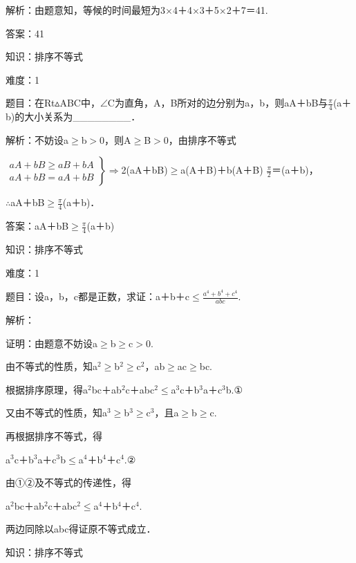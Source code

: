 \documentclass{article} %
\begin{document}
 解析：由题意知，等候的时间最短为3$\mathrm{\times}$4＋4$\mathrm{\times}$3＋5$\mathrm{\times}$2＋7＝41.

 答案：41

 

 知识：排序不等式

 难度：1

 题目：在Rt$\mathrm{\vartriangle}$ABC中，$\mathrm{\angle}$C为直角，A，B所对的边分别为a，b，则aA＋bB与$\frac{\pi}{4}$(a＋b)的大小关系为\_\_\_\_\_\_\_\_．

 解析：不妨设a$\mathrm{\ge}$b$\mathrm{>}$0，则A$\mathrm{\ge}$B$\mathrm{>}$0，由排序不等式

$\left.\begin{array}{l} aA+bB\ge aB+bA\\ aA+bB=aA+bB \end{array}\right\}\mathrm{\Rightarrow }$2(aA＋bB)$\mathrm{\ge}$a(A＋B)＋b(A＋B) $\frac{\pi}{2}$＝(a＋b)，

$\mathrm{\therefore}$aA＋bB$\mathrm{\ge}\frac{\pi}{4}$(a＋b)．

 答案：aA＋bB$\mathrm{\ge}\frac{\pi}{4}$(a＋b)

 

 知识：排序不等式

 难度：1

 题目：设a，b，c都是正数，求证：a＋b＋c$\mathrm{\le}\frac{a^4+b^4+c^4}{abc}$.

 解析：

 证明：由题意不妨设a$\mathrm{\ge}$b$\mathrm{\ge}$c$\mathrm{>}$0.

由不等式的性质，知a${}^{2}$$\mathrm{\ge}$b${}^{2}$$\mathrm{\ge}$c${}^{2}$，ab$\mathrm{\ge}$ac$\mathrm{\ge}$bc.

根据排序原理，得a${}^{2}$bc＋ab${}^{2}$c＋abc${}^{2}$$\mathrm{\le}$a${}^{3}$c＋b${}^{3}$a＋c${}^{3}$b.①

又由不等式的性质，知a${}^{3}$$\mathrm{\ge}$b${}^{3}$$\mathrm{\ge}$c${}^{3}$，且a$\mathrm{\ge}$b$\mathrm{\ge}$c.

再根据排序不等式，得

a${}^{3}$c＋b${}^{3}$a＋c${}^{3}$b$\mathrm{\le}$a${}^{4}$＋b${}^{4}$＋c${}^{4}$.②

由①②及不等式的传递性，得

a${}^{2}$bc＋ab${}^{2}$c＋abc${}^{2}$$\mathrm{\le}$a${}^{4}$＋b${}^{4}$＋c${}^{4}$.

两边同除以abc得证原不等式成立．

 

 知识：排序不等式
\end{document}
